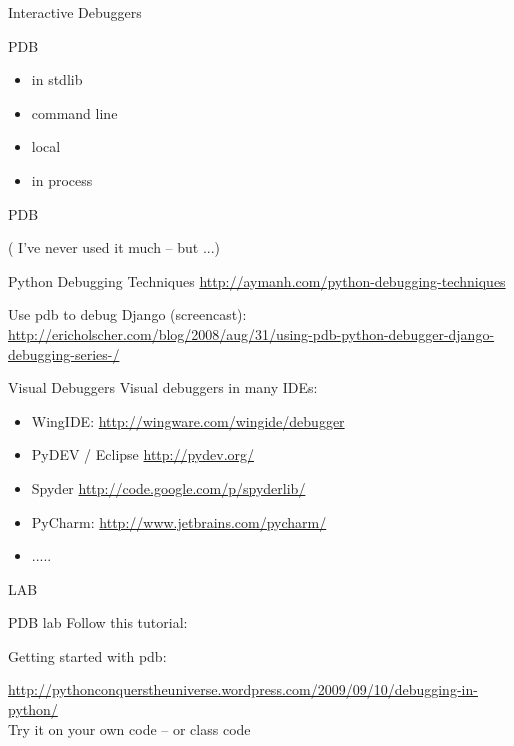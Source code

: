 \documentclass{beamer}
\begin{document}
\begin{frame}[fragile]{Interactive Debuggers}

{\LARGE PDB}

\vfill
{\Large
\begin{itemize}
\item in stdlib
\item command line
\item local
\item in process
\end{itemize}
}

\end{frame} 

\begin{frame}[fragile]{PDB}

( I've never used it much -- but ...)

\vfill
{\Large Python Debugging Techniques}
\url{http://aymanh.com/python-debugging-techniques}

\vfill
{\Large Use pdb to debug Django (screencast):}
\url{http://ericholscher.com/blog/2008/aug/31/using-pdb-python-debugger-django-debugging-series-/}
\end{frame} 

\begin{frame}[fragile]{Visual Debuggers}
\vfill
{\Large Visual debuggers in many IDEs:}
\begin{itemize}
  \item WingIDE: \url{http://wingware.com/wingide/debugger}
  \item PyDEV / Eclipse \url{http://pydev.org/} 
  \item Spyder \url{http://code.google.com/p/spyderlib/}
  \item PyCharm: \url{http://www.jetbrains.com/pycharm/} 
  \item .....
\end{itemize}


\end{frame} 




\begin{frame}{LAB}

{\LARGE PDB lab}
\vfill
{\Large Follow this tutorial:}

\vfill
{\Large Getting started with pdb:}

\url{http://pythonconquerstheuniverse.wordpress.com/2009/09/10/debugging-in-python/}\\

\vfill
{\Large Try it on your own code -- or class code}

\vfill
\end{frame}
\end{document}
